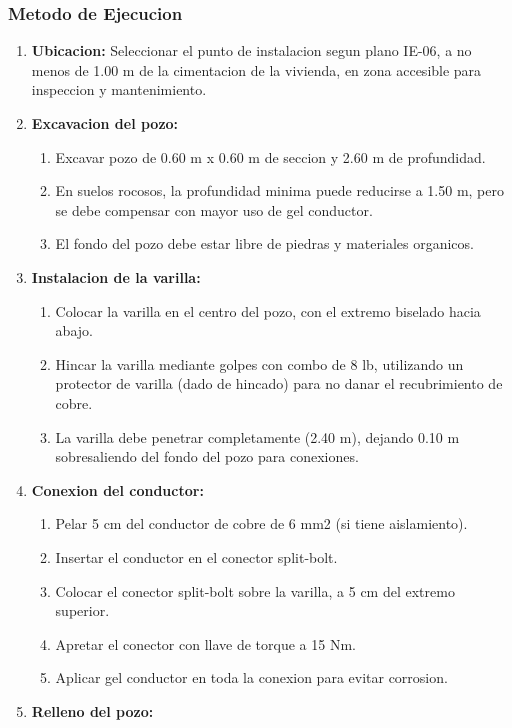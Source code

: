 \subsubsection{Metodo de Ejecucion}

\begin{enumerate}
  \item \textbf{Ubicacion:} Seleccionar el punto de instalacion segun plano IE-06, a no menos de 1.00 m de la cimentacion de la vivienda, en zona accesible para inspeccion y mantenimiento.
  \item \textbf{Excavacion del pozo:}
  \begin{enumerate}
    \item Excavar pozo de 0.60 m x 0.60 m de seccion y 2.60 m de profundidad.
    \item En suelos rocosos, la profundidad minima puede reducirse a 1.50 m, pero se debe compensar con mayor uso de gel conductor.
    \item El fondo del pozo debe estar libre de piedras y materiales organicos.
  \end{enumerate}
  \item \textbf{Instalacion de la varilla:}
  \begin{enumerate}
    \item Colocar la varilla en el centro del pozo, con el extremo biselado hacia abajo.
    \item Hincar la varilla mediante golpes con combo de 8 lb, utilizando un protector de varilla (dado de hincado) para no danar el recubrimiento de cobre.
    \item La varilla debe penetrar completamente (2.40 m), dejando 0.10 m sobresaliendo del fondo del pozo para conexiones.
  \end{enumerate}
  \item \textbf{Conexion del conductor:}
  \begin{enumerate}
    \item Pelar 5 cm del conductor de cobre de 6 mm2 (si tiene aislamiento).
    \item Insertar el conductor en el conector split-bolt.
    \item Colocar el conector split-bolt sobre la varilla, a 5 cm del extremo superior.
    \item Apretar el conector con llave de torque a 15 Nm.
    \item Aplicar gel conductor en toda la conexion para evitar corrosion.
  \end{enumerate}
  \item \textbf{Relleno del pozo:}

\end{enumerate}
